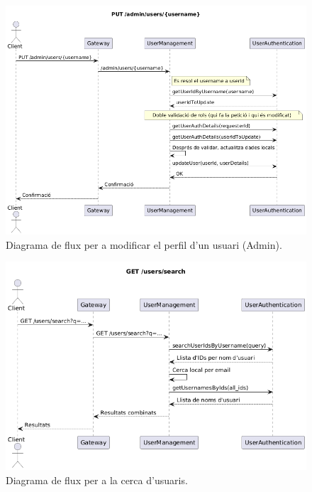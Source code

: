 \begin{figure}[H]
    \centering
    \includegraphics[width=1\textwidth]{Figures/flux/update_other_user_info.png}
    \caption{Diagrama de flux per a modificar el perfil d'un usuari (Admin).}
    \label{fig:flow_update_other_user_info}
\end{figure}

\begin{figure}[H]
    \centering
    \includegraphics[width=1\textwidth]{Figures/flux/search_user.png}
    \caption{Diagrama de flux per a la cerca d'usuaris.}
    \label{fig:flow_search_user}
\end{figure}

